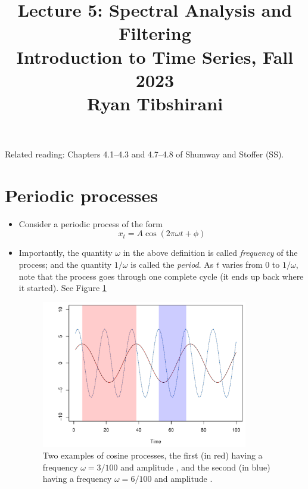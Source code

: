 \documentclass{article}
\title{Lecture 5: Spectral Analysis and Filtering \\ \smallskip  
\large Introduction to Time Series, Fall 2023 \\ \smallskip
Ryan Tibshirani}
\date{}
\begin{document}
\maketitle
\RaggedRight
\vspace{-50pt}

Related reading: Chapters 4.1--4.3 and 4.7--4.8 of Shumway and Stoffer (SS).

\section{Periodic processes}

\begin{itemize}
\item Consider a periodic process of the form 
\begin{equation}
\label{eq:cos_process}
x_t = A \cos(2\pi\omega t + \phi)
\end{equation}

\item Importantly, the quantity $\omega$ in the above definition is called 
  \emph{frequency} of the process; and the quantity $1/\omega$ is called the    
  \emph{period}. As $t$ varies from $0$ to $1/\omega$, note that the process
  goes through one complete cycle (it ends up back where it started). See Figure
  \ref{fig:cos_process} 

\begin{figure}[htb]
\centering
\includegraphics[width=0.85\textwidth]{fig/cos-process-1.pdf}
\caption{Two examples of cosine processes, the first (in red) having a frequency  
  $\omega = 3/100$ and amplitude , and the
  second (in blue) having a frequency $\omega = 6/100$ and amplitude
  .} 
\label{fig:cos_process}
\end{figure}


\end{itemize}
\end{document}
